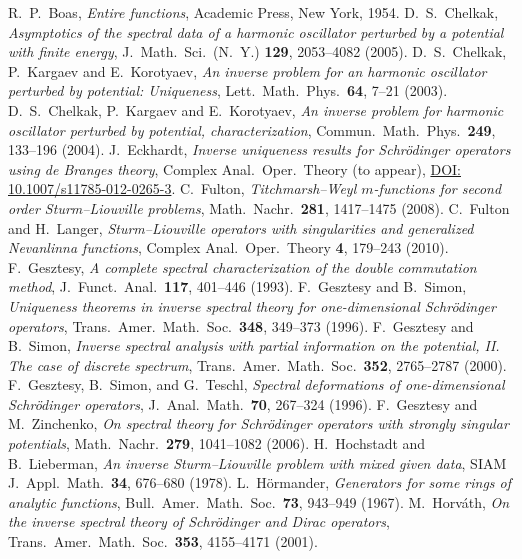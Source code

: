 \documentclass{amsart}
\numberwithin{equation}{section}
\begin{document}
\begin{thebibliography}{XX}
R.\ P.\ Boas, {\em Entire functions}, Academic Press, New York, 1954.
D.\ S.\ Chelkak, {\em Asymptotics of the spectral data of a harmonic oscillator perturbed by a potential with finite energy}, J.\ Math.\ Sci.\ (N.\ Y.) {\bf 129}, 2053--4082 (2005).
D.\ S.\ Chelkak, P.\ Kargaev and E.\ Korotyaev, {\em An inverse problem for an harmonic oscillator perturbed by potential: Uniqueness}, Lett.\ Math.\ Phys.\ {\bf 64}, 7--21 (2003).
D.\ S.\ Chelkak, P.\ Kargaev and E.\ Korotyaev, {\em An inverse problem for harmonic oscillator perturbed by potential, characterization}, Commun.\ Math.\ Phys.\ {\bf 249}, 133--196 (2004).
J.\ Eckhardt, {\em Inverse uniqueness results for Schr\"odinger operators using de Branges theory}, Complex Anal.\ Oper.\ Theory (to appear), {\href{http://dx.doi.org/{10.1007/s11785-012-0265-3}}{DOI: {10.1007/s11785-012-0265-3}}}.
C.\ Fulton, {\em Titchmarsh--Weyl $m$-functions for second order Sturm--Liouville problems}, Math.\ Nachr.\ {\bf 281}, 1417--1475 (2008).
C.\ Fulton and H.\ Langer, {\em Sturm--Liouville operators with singularities and generalized Nevanlinna functions},
Complex Anal.\ Oper.\ Theory {\bf 4}, 179--243 (2010).
F.\ Gesztesy, {\em A complete spectral characterization of the double commutation method}, J.\ Funct.\ Anal.\ {\bf 117}, 401--446 (1993).
F.\ Gesztesy and B.\ Simon, {\em Uniqueness theorems in inverse spectral theory for one-dimensional Schr\"odinger operators}, Trans.\ Amer.\ Math.\ Soc.\ {\bf 348}, 349--373 (1996).
F.\ Gesztesy and B.\ Simon, {\em Inverse spectral analysis with partial information on the potential, II. The case of discrete spectrum},
Trans.\ Amer.\ Math.\ Soc.\ {\bf 352}, 2765--2787 (2000).
F.\ Gesztesy, B.\ Simon, and G.\ Teschl, {\em Spectral deformations of one-dimensional Schr\"odinger operators},
J.\ Anal.\ Math.\ {\bf 70}, 267--324 (1996).
F.\ Gesztesy and M.\ Zinchenko, {\em On spectral theory for Schr\"odinger
operators with strongly singular  potentials}, Math.\ Nachr.\ {\bf 279}, 1041--1082 (2006).
H.\ Hochstadt and B.\ Lieberman, {\em An inverse Sturm--Liouville problem with mixed given data}, SIAM J.\ Appl.\ Math.\ {\bf 34}, 676--680 (1978).
L.\ H\"ormander, {\em Generators for some rings of analytic functions}, Bull.\ Amer.\ Math.\ Soc.\ {\bf 73}, 943--949 (1967).
M.\ Horv\'ath, {\em On the inverse spectral theory of Schr\"odinger and Dirac operators}, Trans.\ Amer.\ Math.\ Soc.\ {\bf 353}, 4155--4171 (2001).

\end{thebibliography}
\end{document}
